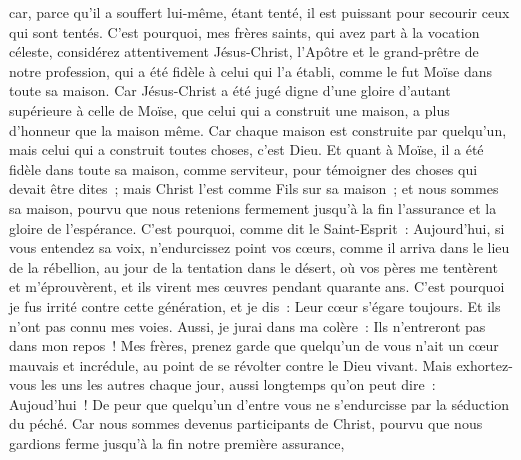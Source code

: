 \begin{multicols}{2}
car, parce qu'il a souffert lui-même, étant tenté, il est puissant pour secourir ceux qui sont tentés.
\VerseOne{}C'est pourquoi, mes frères saints, qui avez part à la vocation céleste, considérez attentivement Jésus-Christ, l'Apôtre et le grand-prêtre de notre profession,
qui a été fidèle à celui qui l'a établi, comme le fut Moïse dans toute sa maison.
Car Jésus-Christ a été jugé digne d'une gloire d'autant supérieure à celle de Moïse, que celui qui a construit une maison, a plus d'honneur que la maison même.
Car chaque maison est construite par quelqu'un, mais celui qui a construit toutes choses, c'est Dieu.
Et quant à Moïse, il a été fidèle dans toute sa maison, comme serviteur, pour témoigner des choses qui devait être dites~;
mais Christ l'est comme Fils sur sa maison~; et nous sommes sa maison, pourvu que nous retenions fermement jusqu'à la fin l'assurance et la gloire de l'espérance.
C'est pourquoi, comme dit le Saint-Esprit~: Aujourd'hui, si vous entendez sa voix,
n'endurcissez point vos cœurs, comme il arriva dans le lieu de la rébellion, au jour de la tentation dans le désert,
où vos pères me tentèrent et m'éprouvèrent, et ils virent mes œuvres pendant quarante ans.
C'est pourquoi je fus irrité contre cette génération, et je dis~: Leur cœur s'égare toujours. Et ils n'ont pas connu mes voies.
Aussi, je jurai dans ma colère~: Ils n'entreront pas dans mon repos~!
Mes frères, prenez garde que quelqu'un de vous n'ait un cœur mauvais et incrédule, au point de se révolter contre le Dieu vivant.
Mais exhortez-vous les uns les autres chaque jour, aussi longtemps qu'on peut dire~: Aujoud'hui~! De peur que quelqu'un d'entre vous ne s'endurcisse par la séduction du péché.
Car nous sommes devenus participants de Christ, pourvu que nous gardions ferme jusqu'à la fin notre première assurance,

\end{multicols}
